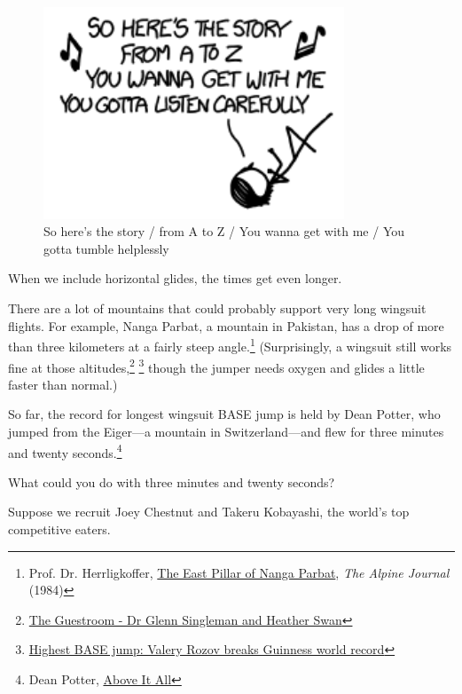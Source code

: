 {\begin{figure}[!htbp]
\centering
\includegraphics[scale=0.5, max width=0.8\textwidth]{imgs/a/51/freefall_wannabe.png}
\caption{So here's the story / from A to Z / You wanna get with me / You gotta tumble helplessly}
\end{figure}

{When we include horizontal glides, the times get even longer.}

{There are a lot of mountains that could probably support very long wingsuit flights. For example, Nanga Parbat, a mountain in Pakistan, has a drop of more than three kilometers at a fairly steep angle.{\footnote{Prof. Dr. Herrligkoffer, \href{http://www.alpinejournal.org.uk/Contents/Contents\_1984\_files/AJ\%201984\%2021-29\%20Herrligkoffer\%20NParbat.pdf}{The East Pillar of Nanga Parbat}, \emph{The Alpine Journal} (1984)} } (Surprisingly, a wingsuit still works fine at those altitudes,{\footnote{ \href{http://www.abc.net.au/local/audio/2010/08/24/2991588.htm}{The Guestroom - Dr Glenn Singleman and Heather Swan}} } {\footnote{ \href{http://www.worldrecordacademy.com/sports/highest\_BASE\_jump\_Valery\_Rozov\_breaks\_Guinness\_world\_record\_213415.html} {Highest BASE jump: Valery Rozov breaks Guinness world record}} } though the jumper needs oxygen and glides a little faster than normal.)}

{So far, the record for longest wingsuit BASE jump is held by Dean Potter, who jumped from the Eiger—a mountain in Switzerland—and flew for three minutes and twenty seconds.{\footnote{Dean Potter, \href{http://www.tonywingsuits.com/deanpotter.html}{Above It All}} } }

{What could you do with three minutes and twenty seconds?}

{Suppose we recruit Joey Chestnut and Takeru Kobayashi, the world's top competitive eaters.}

}
